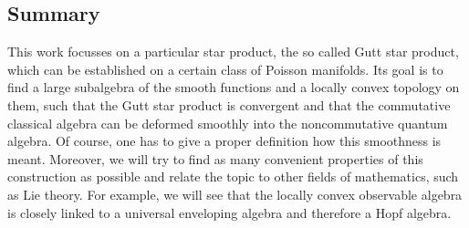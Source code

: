 \subsection*{Summary}

This work focusses on a particular star product, the so called Gutt star 
product, which can be established on a certain class of Poisson manifolds. Its 
goal is to find a large subalgebra of the smooth functions and a locally 
convex topology on them, such that the Gutt star product is convergent and that 
the commutative classical algebra can be deformed smoothly into the 
noncommutative quantum algebra. Of course, one has to give a proper definition 
how this smoothness is meant. Moreover, we will try to find as many convenient 
properties of this construction as possible and relate the topic to other 
fields of mathematics, such as Lie theory. For example, we will see that the 
locally convex observable algebra is closely linked to a universal enveloping 
algebra and therefore a Hopf algebra.


